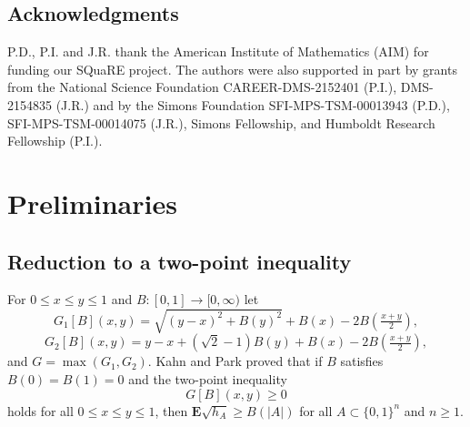 \documentclass[11pt]{amsart}
\theoremstyle{plain}
\theoremstyle{definition}
\theoremstyle{remark}
\numberwithin{equation}{section}
\begin{document}
\subsection*{Acknowledgments} P.D., P.I. and J.R. thank the American Institute of Mathematics (AIM) for funding our SQuaRE project. The authors were also supported in part by grants from the National Science Foundation CAREER-DMS-2152401 (P.I.), DMS-2154835 (J.R.) and by the Simons Foundation
SFI-MPS-TSM-00013943 (P.D.), SFI-MPS-TSM-00014075 (J.R.), Simons Fellowship, and Humboldt Research Fellowship (P.I.).

\section{Preliminaries}\label{sec:envelope}

\subsection{Reduction to a two-point inequality}

For $0\le x\le y\le 1$ and $B:[0,1]\to [0,\infty)$ let
\begin{equation}\label{eqn:Gdef}
G_1[B](x,y) = \sqrt{(y-x)^{2}+B(y)^{2}} + B(x) - 2 B(\tfrac{x+y}2),
\end{equation}
\[ G_2[B](x,y) = y-x + (\sqrt{2}-1) B(y) + B(x) - 2 B(\tfrac{x+y}2),\]
and $G = \max(G_1, G_2).$
Kahn and Park \cite{KP20} proved that if $B$ satisfies $B(0)=B(1)=0$ and the two-point inequality
\[G[B](x,y)\ge 0\]
holds for all $0\le x\le y\le 1$, then $\mathbf{E} \sqrt{h_A}\ge B(|A|)$
for all $A\subset \{0,1\}^n$ and $n\ge 1$.
\end{document}
